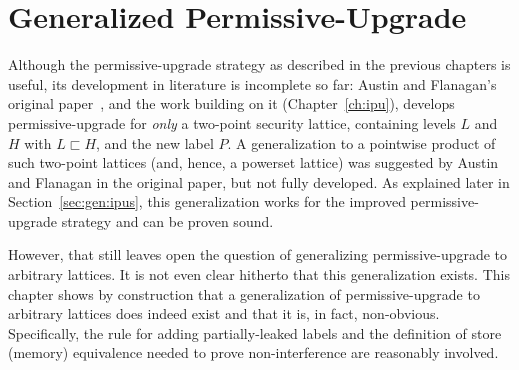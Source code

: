 \chapter{Generalized Permissive-Upgrade}
 
Although the permissive-upgrade strategy as described in the previous
chapters is useful, its development in literature is incomplete so far:
Austin and Flanagan's original paper~\cite{plas10}, and the work
building on it (Chapter~\ref{ch:ipu}), develops permissive-upgrade for
\emph{only} a two-point security lattice, containing levels $L$ and
$H$ with $L \sqsubset H$, and the new label 
$P$. A generalization to a pointwise product of such two-point
lattices (and, hence, a powerset lattice) was suggested by Austin and
Flanagan in the original paper, but not fully developed. As explained
later in Section~\ref{sec:gen:ipus}, this generalization works for the
improved permissive-upgrade strategy and can be proven sound. 

However, that still leaves open the question of generalizing
permissive-upgrade to arbitrary lattices. It is not even clear
hitherto that this generalization exists. This chapter shows by
construction that a generalization of permissive-upgrade to arbitrary
lattices does indeed exist and that it is, in fact,
non-obvious. Specifically, the rule for adding partially-leaked labels
and the definition of store (memory) equivalence needed to prove
non-interference are reasonably involved. 


% 



